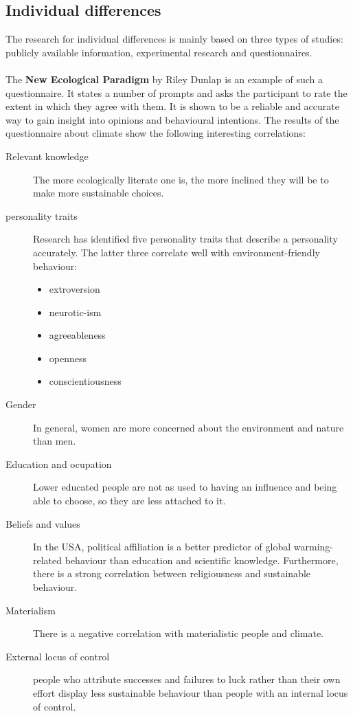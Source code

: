 \documentclass[../summary.tex]{subfiles}
\begin{document}
		\subsection{Individual differences}
			The research for individual differences is mainly based on three types of studies: publicly available information, experimental research and questionnaires.
			\\\\
			The \textbf{New Ecological Paradigm} by Riley Dunlap is an example of such a questionnaire. It states a number of prompts and asks the participant to rate the extent in which they agree with them. It is shown to be a reliable and accurate way to gain insight into opinions and behavioural intentions. The results of the questionnaire about climate show the following interesting correlations:
			\begin{description}
				\item[Relevant knowledge] The more ecologically literate one is, the more inclined they will be to make more sustainable choices. 
				\item[personality traits] Research has identified five personality traits that describe a personality accurately. The latter three correlate well with environment-friendly behaviour:
				\begin{itemize}
					\item extroversion 
					\item neurotic-ism
					\item agreeableness
					\item openness
					\item conscientiousness				
				\end{itemize}
				\item[Gender] In general, women are more concerned about the environment and nature than men. 
				\item[Education and ocupation] Lower educated people are not as used to having an influence and being able to choose, so they are less attached to it. 
				\item[Beliefs and values] In the USA, political affiliation is a better predictor of global warming-related behaviour than education and scientific knowledge. Furthermore, there is a strong correlation between religiousness and sustainable behaviour. 
				\item[Materialism] There is a negative correlation with materialistic people and climate.
				\item[External locus of control] people who attribute successes and failures to luck rather than their own effort display less sustainable behaviour than people with an internal locus of control.
			\end{description}
			
\end{document}
